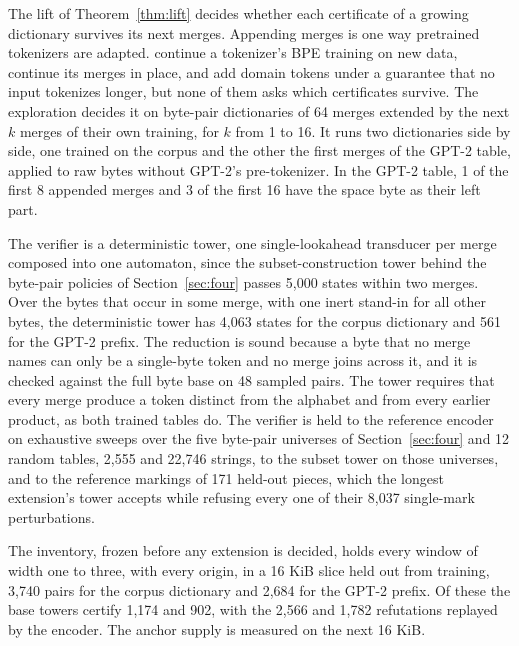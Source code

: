 \documentclass[11pt,a4paper]{article}
\theoremstyle{definition}
\theoremstyle{plain}
\begin{document}
The lift of Theorem~\ref{thm:lift} decides whether each certificate of a growing dictionary survives its next merges.
Appending merges is one way pretrained tokenizers are adapted. \citet{purason2026teaching} continue a tokenizer's BPE
training on new data, \citet{smith2026inplace} continue its merges in place, and \citet{herold2025vocabulary} add domain
tokens under a guarantee that no input tokenizes longer, but none of them asks which certificates survive. The
exploration decides it on byte-pair dictionaries of 64 merges extended by the next $k$ merges of their own training, for
$k$ from 1 to 16. It runs two dictionaries side by side, one trained on the corpus and the other the first merges of the
GPT-2 table, applied to raw bytes without GPT-2's pre-tokenizer. In the GPT-2 table, 1 of the first 8 appended merges
and 3 of the first 16 have the space byte as their left part.

The verifier is a deterministic tower, one single-lookahead transducer per merge composed into one automaton, since the
subset-construction tower behind the byte-pair policies of Section~\ref{sec:four} passes 5{,}000 states within two
merges. Over the bytes that occur in some merge, with one inert stand-in for all other bytes, the deterministic tower
has 4{,}063 states for the corpus dictionary and 561 for the GPT-2 prefix. The reduction is sound because a byte that no
merge names can only be a single-byte token and no merge joins across it, and it is checked against the full byte base
on 48 sampled pairs. The tower requires that every merge produce a token distinct from the alphabet and from every
earlier product, as both trained tables do. The verifier is held to the reference encoder on exhaustive sweeps over the
five byte-pair universes of Section~\ref{sec:four} and 12 random tables, 2{,}555 and 22{,}746 strings, to the subset
tower on those universes, and to the reference markings of 171 held-out pieces, which the longest extension's tower
accepts while refusing every one of their 8{,}037 single-mark perturbations.

The inventory, frozen before any extension is decided, holds every window of width one to three, with every origin, in a
16 KiB slice held out from training, 3{,}740 pairs for the corpus dictionary and 2{,}684 for the GPT-2 prefix. Of these
the base towers certify 1{,}174 and 902, with the 2{,}566 and 1{,}782 refutations replayed by the encoder. The anchor
supply is measured on the next 16 KiB.
\end{document}
